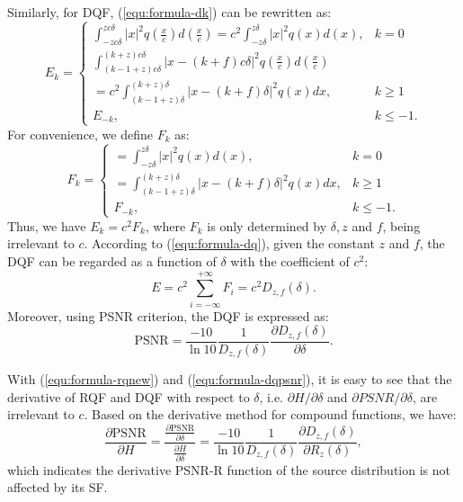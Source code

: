 \documentclass[smallabstract,smallcaptions]{dccpaper}
\begin{document}
Similarly, for DQF, (\ref{equ:formula-dk}) can be rewritten as:  
\begin{equation}\label{equ:formula-dknew}
	E_k =
	\begin{cases}
		\int_{-z c\delta}^{z c\delta} |x|^2 q\left(\frac{x}{c}\right) d\left(\frac{x}{c}\right)
		= c^2\int_{-z \delta}^{z \delta} |x|^2 q(x) d(x),
		& k=0 \\
		\int_{(k-1+z) c\delta}^{(k+z) c\delta} |x - (k+f) c\delta|^2 q\left(\frac{x}{c}\right) d\left(\frac{x}{c}\right)\\
		=c^2\int_{(k-1+z) \delta}^{(k+z) \delta} |x - (k+f) \delta|^2 q(x) dx,
		& k \ge 1 \\
		E_{-k},
		& k \le -1 .
	\end{cases}
\end{equation} 
For convenience, we define $F_k$ as:
\begin{equation}\label{equ:formula-fk}
	F_k =
	\begin{cases}
		= \int_{-z \delta}^{z \delta} |x|^2 q(x) d(x),
		& k=0 \\
		=\int_{(k-1+z) \delta}^{(k+z) \delta} |x - (k+f) \delta|^2 q(x) dx,
		& k \ge 1 \\
		F_{-k},
		& k \le -1 .
	\end{cases}
\end{equation} 
Thus, we have $E_k = c^2 F_k$, where $F_k$ is only determined by $\delta, z$ and $f$, being irrelevant to $c$. According to (\ref{equ:formula-dq}), given the constant $z$ and $f$, the DQF can be regarded as a function of $\delta$ with the coefficient of $c^2$:
\begin{equation}\label{equ:formula-dqnew}
	E = c^2 \sum_{i=-\infty}^{+\infty} F_i = c^2 D_{z,f}(\delta).
\end{equation}
Moreover, using PSNR criterion, the DQF is expressed as:
\begin{equation}\label{equ:formula-dqpsnr}
	\textrm{PSNR} =\frac{-10}{\ln{10}}\frac{1}{D_{z,f}(\delta)}\frac{\partial D_{z,f}(\delta)}{\partial\delta}.
\end{equation}

With (\ref{equ:formula-rqnew}) and (\ref{equ:formula-dqpsnr}), it is easy to see that the derivative of RQF and DQF with respect to $\delta$, i.e. $\partial H / \partial \delta$ and $\partial PSNR / \partial \delta$, are irrelevant to $c$. Based on the derivative method for compound functions, we have: 
\begin{equation}\label{equ:formula-derivativedr}
	\frac{\partial\textrm{PSNR}}{\partial H} = \frac{\frac{\partial\textrm{PSNR}}{\partial\delta}}{\frac{\partial H}{\partial\delta}} 
	= \frac{-10}{\ln{10}}\frac{1}{D_{z,f}(\delta)}\frac{\partial D_{z,f}(\delta)}{\partial R_{z}(\delta)} ,
\end{equation} 
which indicates the derivative PSNR-R function of the source distribution is not affected by its SF.
\end{document}
